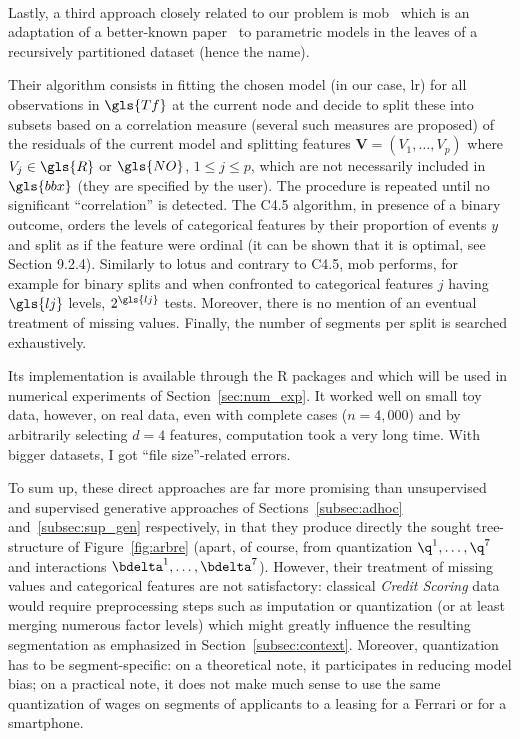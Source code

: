 \paragraph{} \label{par:mob}

Lastly, a third approach closely related to our problem is \gls{mob}~\cite{zeileis2008model} which is an adaptation of a better-known paper~\cite{hothorn2006unbiased} to parametric models in the leaves of a recursively partitioned dataset (hence the name).

Their algorithm consists in fitting the chosen model (in our case, \gls{lr}) for all observations in $\gls{Tf}$ at the current node and decide to split these into subsets based on a correlation measure (several such measures are proposed) of the residuals of the current model and splitting features $\bm{V} = (V_1, \dots, V_p)$ where $V_j \in \gls{R}$ or $\gls{NO}$, $1 \leq j \leq p$, which are not necessarily included in $\gls{bbx}$ (they are specified by the user). The procedure is repeated until no significant ``correlation'' is detected. The C4.5 algorithm, in presence of a binary outcome, orders the levels of categorical features by their proportion of events $y$ and split as if the feature were ordinal (it can be shown that it is optimal, see~\cite{friedman2001elements} Section 9.2.4).  Similarly to \gls{lotus} and contrary to C4.5, \gls{mob} performs, for example for binary splits and when confronted to categorical features $j$ having $\gls{lj}$ levels, $2^{\gls{lj}}$ tests. Moreover, there is no mention of an eventual treatment of missing values. Finally, the number of segments per split is searched exhaustively.

Its implementation is available through the \textsf{R} packages  and  which will be used in numerical experiments of Section~\ref{sec:num_exp}. It worked well on small toy data, however, on real data, even with complete cases ($n = 4{,}000$) and by arbitrarily selecting $d = 4$ features, computation took a very long time. With bigger datasets, I got ``file size''-related errors.

\medskip

To sum up, these direct approaches are far more promising than unsupervised and supervised generative approaches of Sections~\ref{subsec:adhoc} and~\ref{subsec:sup_gen} respectively, in that they produce directly the sought tree-structure of Figure~\ref{fig:arbre} (apart, of course, from quantization $\q^1, \dots, \q^7$ and interactions $\bdelta^1, \dots, \bdelta^7$). However, their treatment of missing values and categorical features are not satisfactory: classical \textit{Credit Scoring} data would require preprocessing steps such as imputation or quantization (or at least merging numerous factor levels) which might greatly influence the resulting segmentation as emphasized in Section~\ref{subsec:context}. Moreover, quantization has to be segment-specific: on a theoretical note, it participates in reducing model bias; on a practical note, it does not make much sense to use the same quantization of wages on segments of applicants to a leasing for a Ferrari or for a smartphone.

